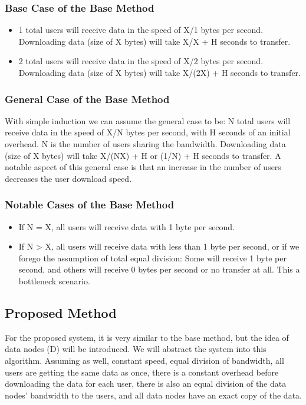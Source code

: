 \documentclass[acmsmall]{acmart}
\begin{document}
\subsubsection{Base Case of the Base Method}
    \begin{itemize} 
        \item 1 total users will receive data in the speed of X/1 bytes per second. Downloading data (size of X bytes) will take X/X + H seconds to transfer.
        \item 2 total users will receive data in the speed of X/2 bytes per second. Downloading data (size of X bytes) will take X/(2X) + H seconds to transfer.
    \end{itemize}

\subsubsection{General Case of the Base Method} 
With simple induction we can assume the general case to be: N total users will receive data in the speed of X/N bytes per second, with H seconds of an initial overhead. N is the number of users sharing the bandwidth. Downloading data (size of X bytes) will take X/(NX) + H or (1/N) + H seconds to transfer. A notable aspect of this general case is that an increase in the number of users decreases the user download speed.

\subsubsection{Notable Cases of the Base Method}
    \begin{itemize} 
        \item If N = X, all users will receive data with 1 byte per second.
        \item If N > X, all users will receive data with less than 1 byte per second, or if we forego the assumption of total equal division: Some will receive 1 byte per second, and others will receive 0 bytes per second or no transfer at all. This a bottleneck scenario.
    \end{itemize}

\subsection{Proposed Method}
For the proposed system, it is very similar to the base method, but the idea of data nodes (D) will be introduced. We will abstract the system into this algorithm. Assuming as well, constant speed, equal division of bandwidth, all users are getting the same data as once, there is a constant overhead before downloading the data for each user, there is also an equal division of the data nodes' bandwidth to the users, and all data nodes have an exact copy of the data.
\end{document}
